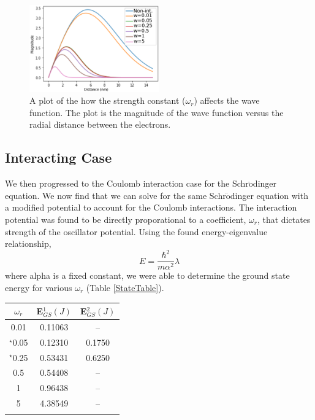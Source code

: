 \documentclass[%
reprint,
superscriptaddress,
showpacs,
nofootinbib,
bibnotes,amsmath,amssymb,aps,
prc, 
]{revtex4-1}
\begin{document}
		
\begin{figure}
	\centering
	\includegraphics[width=0.5\textwidth]{Graph.eps}
	\caption{A plot of the how the strength constant ($\omega_{r}$) affects the wave function.  The plot is the magnitude of the wave function versus the radial distance between the electrons. }
	\label{fig:graph}
\end{figure}

	
	\subsection{Interacting Case}
	
	We then progressed to the Coulomb interaction case for the Schr$\ddot{\textrm{o}}$dinger equation.  We now find that we can solve for the same Schr$\ddot{\textrm{o}}$dinger equation with a modified potential to account for the Coulomb interactions.  The interaction potential was found to be directly proporational to a coefficient, $\omega_{r}$, that dictates strength of the oscillator potential.  Using the found energy-eigenvalue relationship, \begin{equation}
	E=\frac{\hbar^{2}}{m\alpha^{2}}\lambda
	\end{equation} where alpha is a fixed constant, we were able to determine the ground state energy for various $\omega_{r}$ (Table \ref{StateTable}).
	
	
	
	\begin{center}
		\begin{tabular}{ccc}
			\hline \hline
			$\omega_{r}$ &  E$_{GS}^{1} (J)$ & E$_{GS}^{2} (J)$ \cite{PhysRevA.48.3561}\\
			\hline
			0.01 & 0.11063 & -- \\
			$^{\star}$0.05 & 0.12310 & 0.1750\\
			$^{\star}$0.25 & 0.53431 & 0.6250\\
			0.5 & 0.54408 & --\\
			1 & 0.96438 & -- \\
			5 & 4.38549 & --\\
			\hline
			\label{StateTable}
		\end{tabular}
	\end{center}
\end{document}
